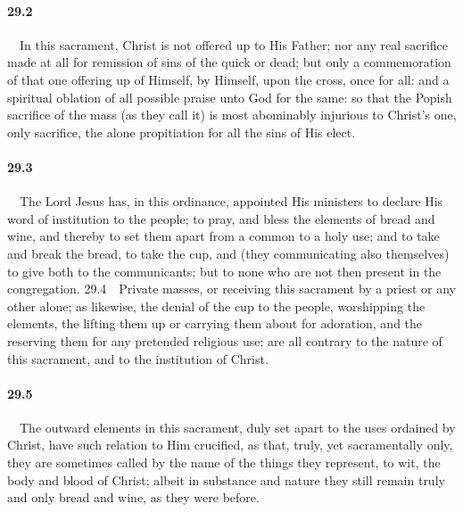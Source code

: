 \paragraph{29.2}\ \ In this sacrament, Christ is not offered up to His Father; nor any real sacrifice made at all for remission of sins of the quick or dead; but only a commemoration of that one offering up of Himself, by Himself, upon the cross, once for all: and a spiritual oblation of all possible praise unto God for the same: so that the Popish sacrifice of the mass (as they call it) is most abominably injurious to Christ's one, only sacrifice, the alone propitiation for all the sins of His elect.   
\bigskip
\paragraph{29.3}\ \ The Lord Jesus has, in this ordinance, appointed His ministers to declare His word of institution to the people; to pray, and bless the elements of bread and wine, and thereby to set them apart from a common to a holy use; and to take and break the bread, to take the cup, and (they communicating also themselves) to give both to the communicants; but to none who are not then present in the congregation.  29.4\ \ Private masses, or receiving this sacrament by a priest or any other alone; as likewise, the denial of the cup to the people, worshipping the elements, the lifting them up or carrying them about for adoration, and the reserving them for any pretended religious use; are all contrary to the nature of this sacrament, and to the institution of Christ.   
\bigskip
\paragraph{29.5}\ \ The outward elements in this sacrament, duly set apart to the uses ordained by Christ, have such relation to Him crucified, as that, truly, yet sacramentally only, they are sometimes called by the name of the things they represent, to wit, the body and blood of Christ; albeit in substance and nature they still remain truly and only bread and wine, as they were before.   
\bigskip
